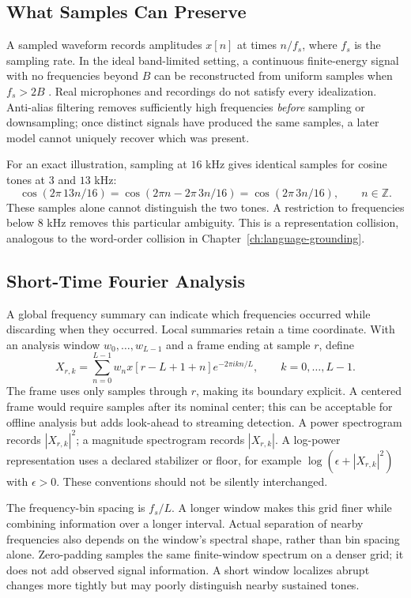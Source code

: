 \subsection{What Samples Can Preserve}

A sampled waveform records amplitudes $x[n]$ at times $n/f_s$, where $f_s$ is the sampling rate. In the ideal band-limited setting, a continuous finite-energy signal with no frequencies beyond $B$ can be reconstructed from uniform samples when $f_s>2B$ \citep{shannon1949}. Real microphones and recordings do not satisfy every idealization. Anti-alias filtering removes sufficiently high frequencies \emph{before} sampling or downsampling; once distinct signals have produced the same samples, a later model cannot uniquely recover which was present.

For an exact illustration, sampling at $16$ kHz gives identical samples for cosine tones at $3$ and $13$ kHz:
\[
 \cos(2\pi\,13n/16)
 =\cos(2\pi n-2\pi\,3n/16)
 =\cos(2\pi\,3n/16),\qquad n\in\mathbb Z.
\]
These samples alone cannot distinguish the two tones. A restriction to frequencies below $8$ kHz removes this particular ambiguity. This is a representation collision, analogous to the word-order collision in Chapter~\ref{ch:language-grounding}.

\subsection{Short-Time Fourier Analysis}

A global frequency summary can indicate which frequencies occurred while discarding when they occurred. Local summaries retain a time coordinate. With an analysis window $w_0,\ldots,w_{L-1}$ and a frame ending at sample $r$, define
\[
 X_{r,k}=\sum_{n=0}^{L-1}w_n x[r-L+1+n]
           e^{-2\pi i kn/L},\qquad k=0,\ldots,L-1.
\]
The frame uses only samples through $r$, making its boundary explicit. A centered frame would require samples after its nominal center; this can be acceptable for offline analysis but adds look-ahead to streaming detection. A power spectrogram records $|X_{r,k}|^2$; a magnitude spectrogram records $|X_{r,k}|$. A log-power representation uses a declared stabilizer or floor, for example $\log(\epsilon+|X_{r,k}|^2)$ with $\epsilon>0$. These conventions should not be silently interchanged.

The frequency-bin spacing is $f_s/L$. A longer window makes this grid finer while combining information over a longer interval. Actual separation of nearby frequencies also depends on the window's spectral shape, rather than bin spacing alone. Zero-padding samples the same finite-window spectrum on a denser grid; it does not add observed signal information. A short window localizes abrupt changes more tightly but may poorly distinguish nearby sustained tones.

